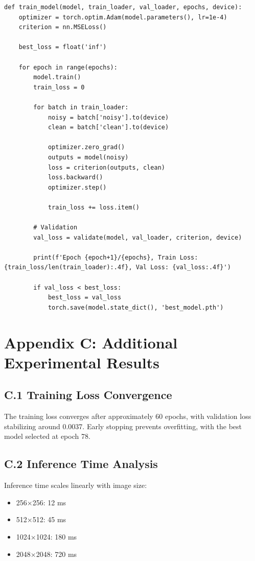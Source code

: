 \documentclass[12pt,a4paper]{report}
\begin{document}
\begin{verbatim}
def train_model(model, train_loader, val_loader, epochs, device):
    optimizer = torch.optim.Adam(model.parameters(), lr=1e-4)
    criterion = nn.MSELoss()

    best_loss = float('inf')

    for epoch in range(epochs):
        model.train()
        train_loss = 0

        for batch in train_loader:
            noisy = batch['noisy'].to(device)
            clean = batch['clean'].to(device)

            optimizer.zero_grad()
            outputs = model(noisy)
            loss = criterion(outputs, clean)
            loss.backward()
            optimizer.step()

            train_loss += loss.item()

        # Validation
        val_loss = validate(model, val_loader, criterion, device)

        print(f'Epoch {epoch+1}/{epochs}, Train Loss: {train_loss/len(train_loader):.4f}, Val Loss: {val_loss:.4f}')

        if val_loss < best_loss:
            best_loss = val_loss
            torch.save(model.state_dict(), 'best_model.pth')
\end{verbatim}

\section*{Appendix C: Additional Experimental Results}

\subsection*{C.1 Training Loss Convergence}

The training loss converges after approximately 60 epochs, with validation loss stabilizing around 0.0037. Early stopping prevents overfitting, with the best model selected at epoch 78.

\subsection*{C.2 Inference Time Analysis}

Inference time scales linearly with image size:
\begin{itemize}
    \item 256×256: 12 ms
    \item 512×512: 45 ms
    \item 1024×1024: 180 ms
    \item 2048×2048: 720 ms
\end{itemize}
\end{document}
